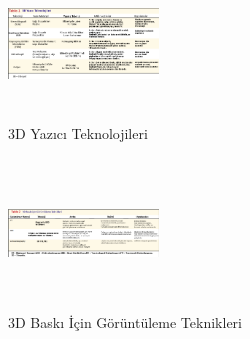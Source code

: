 \documentclass{IEEEtran}
\begin{document}
\begin{figure}[!t]
\caption{3D Yazıcı Teknolojileri}
\centerline{\includegraphics[width=4cm,height=4cm]{Tablo 1.png}}
\label{figt1}
\end{figure}

\begin{figure}[!t]
\caption{3D Baskı İçin Görüntüleme Teknikleri}
\centerline{\includegraphics[width=4cm,height=4cm]{Tablo 2.png}}
\label{figt2}
\end{figure}
\end{document}

